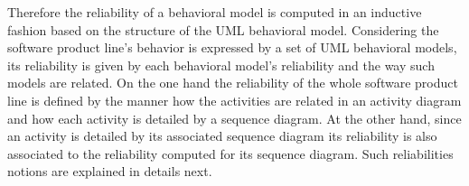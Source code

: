 % 
% 
% 

Therefore the reliability of a behavioral model is computed in an inductive fashion based on
the structure of the UML behavioral model. Considering the software product
line's behavior is expressed by a set of UML behavioral models, its reliability
is given by each behavioral model's reliability and the way such models are
related. On the one hand the reliability of the whole software product line is
defined by the manner how the activities are related in an activity diagram and
how each activity is detailed by a sequence diagram. At the other hand, since
an activity is detailed by its associated sequence diagram its reliability is
also associated to the reliability computed for its sequence diagram. Such
reliabilities notions are explained in details next.


